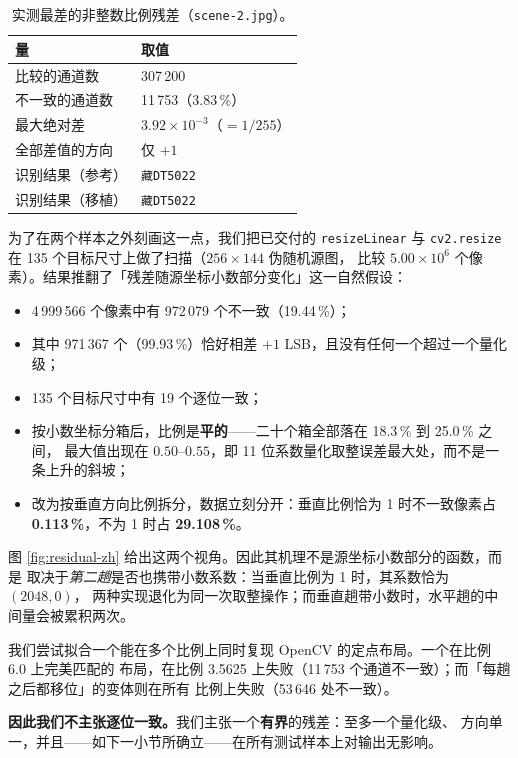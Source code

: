 \documentclass[UTF8,a4paper,11pt]{ctexart}
\begin{document}
\begin{table}[htbp]
\centering
\caption{实测最差的非整数比例残差（\texttt{scene-2.jpg}）。}
\label{tab:residual-zh}
\small
\begin{tabular}{@{}ll@{}}
\hline
\textbf{量} & \textbf{取值}\\
\hline
比较的通道数 & 307\,200\\
不一致的通道数 & 11\,753（3.83\,\%）\\
最大绝对差 & $3.92\times10^{-3}$（$=1/255$）\\
全部差值的方向 & 仅 $+1$\\
识别结果（参考） & \texttt{藏DT5022}\\
识别结果（移植） & \texttt{藏DT5022}\\
\hline
\end{tabular}
\end{table}

为了在两个样本之外刻画这一点，我们把已交付的 \texttt{resizeLinear} 与
\texttt{cv2.resize} 在 135 个目标尺寸上做了扫描（$256\times144$ 伪随机源图，
比较 $5.00\times10^6$ 个像素）。结果推翻了「残差随源坐标小数部分变化」这一自然假设：

\begin{itemize}
\item 4\,999\,566 个像素中有 972\,079 个不一致（19.44\,\%）；
\item 其中 971\,367 个（99.93\,\%）恰好相差 $+1$ LSB，且没有任何一个超过一个量化级；
\item 135 个目标尺寸中有 19 个逐位一致；
\item 按小数坐标分箱后，比例是\textbf{平的}——二十个箱全部落在 18.3\,\% 到 25.0\,\% 之间，
最大值出现在 $0.50$--$0.55$，即 11 位系数量化取整误差最大处，而不是一条上升的斜坡；
\item 改为按垂直方向比例拆分，数据立刻分开：垂直比例恰为 1 时不一致像素占
\textbf{0.113\,\%}，不为 1 时占 \textbf{29.108\,\%}。
\end{itemize}

图 \ref{fig:residual-zh} 给出这两个视角。因此其机理不是源坐标小数部分的函数，而是
取决于\emph{第二趟}是否也携带小数系数：当垂直比例为 1 时，其系数恰为 $(2048, 0)$，
两种实现退化为同一次取整操作；而垂直趟带小数时，水平趟的中间量会被累积两次。

我们尝试拟合一个能在多个比例上同时复现 OpenCV 的定点布局。一个在比例 6.0 上完美匹配的
布局，在比例 3.5625 上失败（11\,753 个通道不一致）；而「每趟之后都移位」的变体则在所有
比例上失败（53\,646 处不一致）。

\textbf{因此我们不主张逐位一致。}我们主张一个\textbf{有界}的残差：至多一个量化级、
方向单一，并且——如下一小节所确立——在所有测试样本上对输出无影响。
\end{document}
